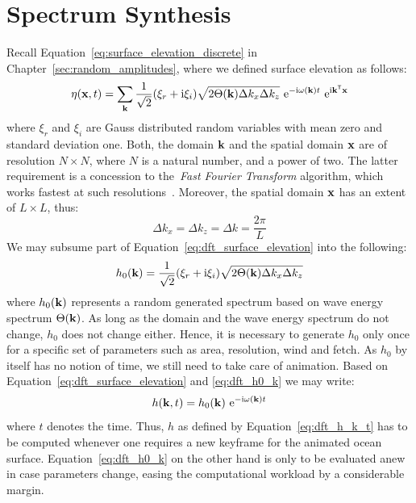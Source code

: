 \section{Spectrum Synthesis}
\label{sec:spectrum_synthesis}
Recall Equation~\ref{eq:surface_elevation_discrete} in Chapter~\ref{sec:random_amplitudes},
where we defined surface elevation as follows:
\begin{equation}
\label{eq:dft_surface_elevation}
\eta(\mathbf{x}, t) = 
\sum_{\mathbf{k}}\frac{1}{\sqrt{2}}(\xi_r+\mathrm{i}\xi_i)
\sqrt{2\Theta(\mathbf{k})\Delta k_x \Delta k_z} 
~\mathrm{e}^{-\mathrm{i}\omega(\mathbf{k})t}
~\mathrm{e}^{\mathrm{i}\mathbf{k}^{\mathsf{T}}\mathbf{x}}
\end{equation}
where $\xi_r$ and $\xi_i$ are Gauss distributed random variables with mean zero 
and standard deviation one. Both, the \wavevector domain $\mathbf{k}$ and the
spatial domain $\mathbf{x}$ are of resolution $N \times N$, where $N$ is a natural
number, and a power of two. The latter requirement is a concession to
the~\emph{Fast Fourier Transform} algorithm, which works fastest at such
resolutions~\citep{Cooley:1965}.
Moreover, the spatial domain $\mathbf{x}$ has an extent of $L \times L$, thus:
\begin{equation*}
	\Delta k_x = \Delta k_z = \Delta k = \frac{2\pi}{L}
\end{equation*}
We may subsume part of Equation~\ref{eq:dft_surface_elevation} into the
following:
\begin{equation}
\label{eq:dft_h0_k}
h_0(\mathbf{k}) = \frac{1}{\sqrt{2}}(\xi_r+\mathrm{i}\xi_i)\sqrt{2\Theta(\mathbf{k})\Delta k_x \Delta k_z}
\end{equation}
where $h_0(\mathbf{k})$ represents a random generated spectrum based on wave
energy spectrum $\Theta(\mathbf{k})$. As long as the \wavevector domain and the
wave energy spectrum do not change, $h_0$ does not change either. Hence, it is
necessary to generate $h_0$ only once for a specific set of parameters such as
area, resolution, wind and fetch. As $h_0$ by itself has no notion of time,
we still need to take care of animation. Based on Equation~\ref{eq:dft_surface_elevation}
and \ref{eq:dft_h0_k} we may write:
\begin{equation}
\label{eq:dft_h_k_t}
h(\mathbf{k},t) = h_0(\mathbf{k})~\mathrm{e}^{-\mathrm{i}\omega(\mathbf{k})t}
\end{equation}
where $t$ denotes the time.
Thus, $h$ as defined by Equation~\ref{eq:dft_h_k_t} has to be computed whenever
one requires a new keyframe for the animated ocean surface.
Equation~\ref{eq:dft_h0_k} on the other hand is only to be evaluated anew in
case parameters change, easing the computational workload by a
considerable margin.

